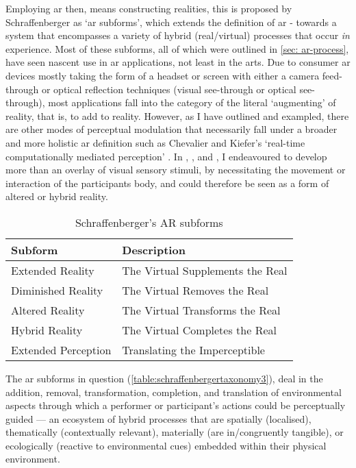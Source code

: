 Employing \gls{ar} then, means constructing realities, this is proposed by Schraffenberger as `\gls{ar} subforms', which extends the definition of \gls{ar} - towards a system that encompasses a variety of hybrid (real/virtual) processes that occur \textit{in} experience. Most of these subforms, all of which were outlined in \autoref{sec: ar-process}, have seen nascent use in \gls{ar} applications, not least in the arts. Due to consumer \gls{ar} devices mostly taking the form of a headset or screen with either a camera feed-through or optical reflection techniques (visual see-through or optical see-through), most applications fall into the category of the literal `augmenting' of reality, that is, to add to reality. However, as I have outlined and exampled, there are other modes of perceptual modulation that necessarily fall under a broader and more holistic \gls{ar} definition such as Chevalier and Kiefer's `real-time computationally mediated perception' \citeyearpar[]{chevalier2020}. In \textit{}, \textit{}, and \textit{}, I endeavoured to develop more than an overlay of visual sensory stimuli, by necessitating the movement or interaction of the participants body, and could therefore be seen as a form of altered or hybrid reality.

\begin{table}
    \centering
    \begin{tabular}{ l l }
        \toprule
        Subform             & Description                       \\
        \midrule
        Extended Reality    & The Virtual Supplements the Real  \\
        Diminished Reality  & The Virtual Removes the Real      \\
        Altered Reality     & The Virtual Transforms the Real   \\
        Hybrid Reality      & The Virtual Completes the Real    \\
        Extended Perception & Translating the Imperceptible     \\
        \bottomrule
    \end{tabular}
    \caption{Schraffenberger's AR subforms}\label{table:schraffenbergertaxonomy3}
\end{table}

The \gls{ar} subforms in question (\autoref{table:schraffenbergertaxonomy3}), deal in the addition, removal, transformation, completion, and translation of environmental aspects through which a performer or participant's actions could be perceptually guided — an ecosystem of hybrid processes that are spatially (localised), thematically (contextually relevant), materially (are in/congruently tangible), or ecologically (reactive to environmental cues) embedded within their physical environment.

